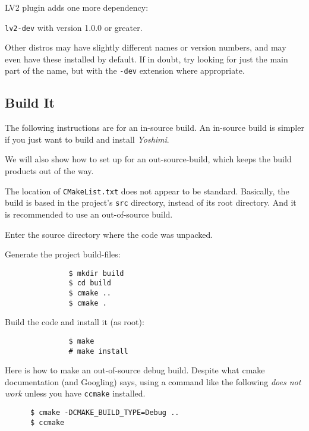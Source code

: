 	LV2 plugin adds one more dependency:

		\texttt{lv2-dev} with version 1.0.0 or greater.

   Other distros may have slightly different names or version numbers, and may
   even have these installed by default. If in doubt, try looking for just the
   main part of the name, but with the \texttt{-dev} extension where
   appropriate.

\subsection{Build It}
\label{subsec:yoshimi_build_it}

   The following instructions are for an in-source build.  An in-source
   build is simpler if you just want to build and install \textsl{Yoshimi}.

   We will also show how to set up for an out-source-build, which keeps
   the build products out of the way.

   The location of \texttt{CMakeList.txt} does not appear to be standard.
   Basically, the build is based in the project's
   \texttt{src} directory, instead of its root directory.
   And it is recommended to use an out-of-source build.

   \begin{enumber}
      \item Enter the source directory where the code was unpacked.
      \item Generate the project build-files:
            \begin{verbatim}
               $ mkdir build
               $ cd build
               $ cmake ..
               $ cmake .
            \end{verbatim}
      \item Build the code and install it (as root):
            \begin{verbatim}
               $ make
               # make install
            \end{verbatim}
   \end{enumber}

   Here is how to make an out-of-source debug build.  Despite what
   cmake documentation (and Googling) says, using a command like the
   following \textsl{does not work} unless you have \texttt{ccmake}
   installed.

   \begin{verbatim}
      $ cmake -DCMAKE_BUILD_TYPE=Debug ..
      $ ccmake
   \end{verbatim}

